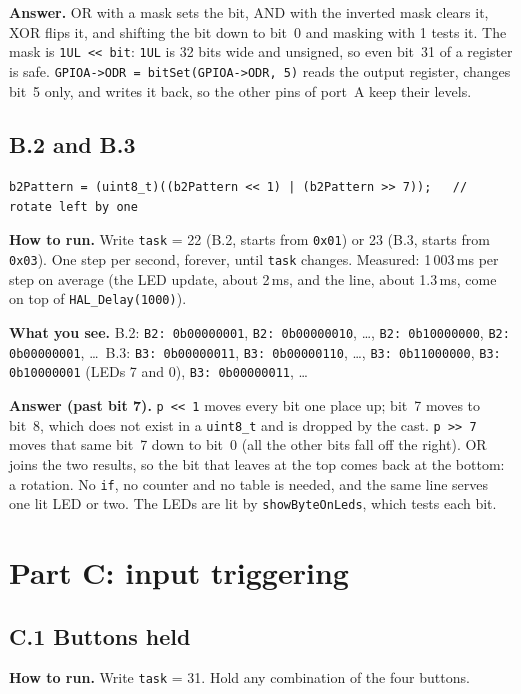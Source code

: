 \documentclass[11pt,a4paper]{article}
\newcommand{\lv}[1]{\texttt{#1}}                 %
\newcommand{\run}[1]{\textbf{How to run.} #1}
\newcommand{\see}[1]{\textbf{What you see.} #1}
\begin{document}
\textbf{Answer.} OR with a mask sets the bit, AND with the inverted mask clears it, XOR flips it, and shifting the bit
down to bit~0 and masking with 1 tests it. The mask is \texttt{1UL << bit}: \texttt{1UL} is 32 bits wide and unsigned,
so even bit~31 of a register is safe. \texttt{GPIOA->ODR = bitSet(GPIOA->ODR, 5)} reads the output register, changes
bit~5 only, and writes it back, so the other pins of port~A keep their levels.

\subsection*{B.2 and B.3}
\begin{lstlisting}
b2Pattern = (uint8_t)((b2Pattern << 1) | (b2Pattern >> 7));   // rotate left by one
\end{lstlisting}
\run{Write \lv{task} = 22 (B.2, starts from \texttt{0x01}) or 23 (B.3, starts from \texttt{0x03}). One step per
second, forever, until \lv{task} changes. Measured: 1\,003\,ms per step on average (the LED update, about 2\,ms, and
the line, about 1.3\,ms, come on top of \texttt{HAL\_Delay(1000)}).}

\see{B.2: \texttt{B2: 0b00000001}, \texttt{B2: 0b00000010}, \ldots, \texttt{B2: 0b10000000}, \texttt{B2: 0b00000001},
\ldots\ B.3: \texttt{B3: 0b00000011}, \texttt{B3: 0b00000110}, \ldots, \texttt{B3: 0b11000000}, \texttt{B3: 0b10000001}
(LEDs 7 and 0), \texttt{B3: 0b00000011}, \ldots}

\textbf{Answer (past bit 7).} \texttt{p << 1} moves every bit one place up; bit~7 moves to bit~8, which does not
exist in a \texttt{uint8\_t} and is dropped by the cast. \texttt{p >> 7} moves that same bit~7 down to bit~0 (all the
other bits fall off the right). OR joins the two results, so the bit that leaves at the top comes back at the bottom:
a rotation. No \texttt{if}, no counter and no table is needed, and the same line serves one lit LED or two. The LEDs
are lit by \texttt{showByteOnLeds}, which tests each bit.

\section{Part C: input triggering}

\subsection*{C.1 Buttons held}
\run{Write \lv{task} = 31. Hold any combination of the four buttons.}
\end{document}
